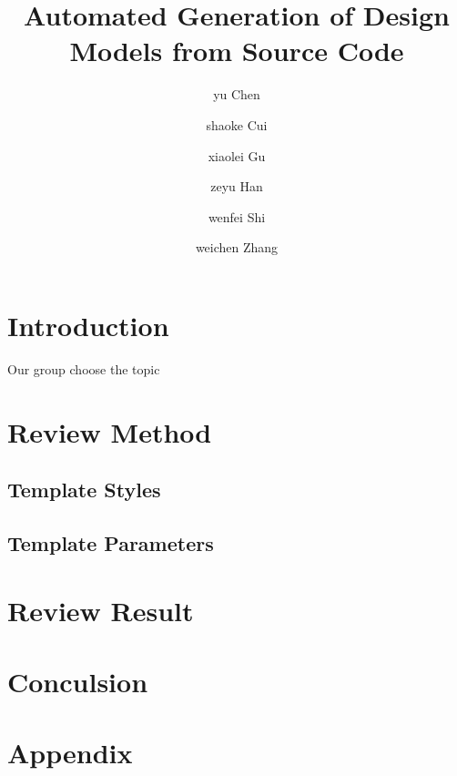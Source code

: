 \documentclass[acmsmall]{acmart}
\begin{document}
\title{Automated Generation of Design Models from Source Code}


\author{yu Chen}
\author{shaoke Cui}
\author{xiaolei Gu}
\author{zeyu Han}
\author{wenfei Shi}
\author{weichen Zhang}


\begin{abstract}
  
\end{abstract}




\maketitle

\section{Introduction}
Our group choose the topic

\section{Review Method}


\subsection{Template Styles}


\subsection{Template Parameters}


\section{Review Result}


\section{Conculsion}





\section{Appendix}
\end{document}
